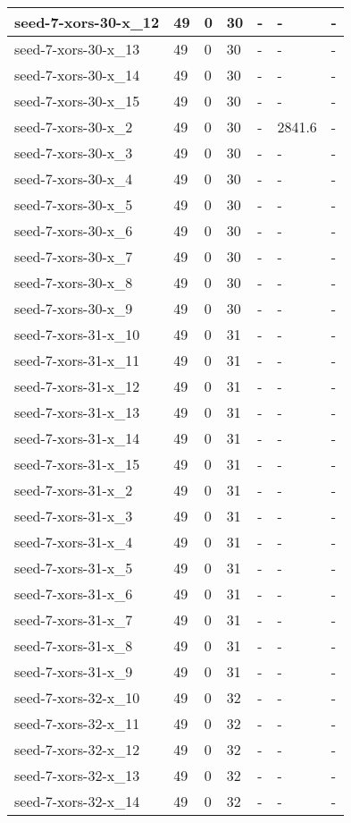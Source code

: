 \begin{scriptsize}
\begin{longtable}{|p{5cm}|l|l|l|l|l|l|}
seed-7-xors-30-x\_12&49&0&30&-&-&- \\ \hline 
seed-7-xors-30-x\_13&49&0&30&-&-&- \\ \hline 
seed-7-xors-30-x\_14&49&0&30&-&-&- \\ \hline 
seed-7-xors-30-x\_15&49&0&30&-&-&- \\ \hline 
seed-7-xors-30-x\_2&49&0&30&-&2841.6&- \\ \hline 
seed-7-xors-30-x\_3&49&0&30&-&-&- \\ \hline 
seed-7-xors-30-x\_4&49&0&30&-&-&- \\ \hline 
seed-7-xors-30-x\_5&49&0&30&-&-&- \\ \hline 
seed-7-xors-30-x\_6&49&0&30&-&-&- \\ \hline 
seed-7-xors-30-x\_7&49&0&30&-&-&- \\ \hline 
seed-7-xors-30-x\_8&49&0&30&-&-&- \\ \hline 
seed-7-xors-30-x\_9&49&0&30&-&-&- \\ \hline 
seed-7-xors-31-x\_10&49&0&31&-&-&- \\ \hline 
seed-7-xors-31-x\_11&49&0&31&-&-&- \\ \hline 
seed-7-xors-31-x\_12&49&0&31&-&-&- \\ \hline 
seed-7-xors-31-x\_13&49&0&31&-&-&- \\ \hline 
seed-7-xors-31-x\_14&49&0&31&-&-&- \\ \hline 
seed-7-xors-31-x\_15&49&0&31&-&-&- \\ \hline 
seed-7-xors-31-x\_2&49&0&31&-&-&- \\ \hline 
seed-7-xors-31-x\_3&49&0&31&-&-&- \\ \hline 
seed-7-xors-31-x\_4&49&0&31&-&-&- \\ \hline 
seed-7-xors-31-x\_5&49&0&31&-&-&- \\ \hline 
seed-7-xors-31-x\_6&49&0&31&-&-&- \\ \hline 
seed-7-xors-31-x\_7&49&0&31&-&-&- \\ \hline 
seed-7-xors-31-x\_8&49&0&31&-&-&- \\ \hline 
seed-7-xors-31-x\_9&49&0&31&-&-&- \\ \hline 
seed-7-xors-32-x\_10&49&0&32&-&-&- \\ \hline 
seed-7-xors-32-x\_11&49&0&32&-&-&- \\ \hline 
seed-7-xors-32-x\_12&49&0&32&-&-&- \\ \hline 
seed-7-xors-32-x\_13&49&0&32&-&-&- \\ \hline 
seed-7-xors-32-x\_14&49&0&32&-&-&- \\ \hline 

\end{longtable}
\end{scriptsize}

